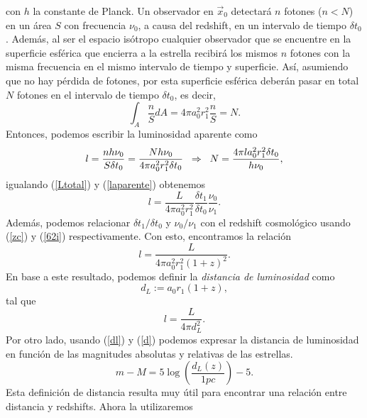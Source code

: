 con $h$ la constante de Planck. Un observador en $\vec{x}_{0}$ detectará $n$ fotones ($n<N$) en un área $S$ con frecuencia $\nu_{0}$, a causa del redshift,
en un intervalo de tiempo $\delta t_{0}$. Además, al ser el espacio isótropo cualquier observador que se encuentre en la superficie
esférica que encierra a la estrella recibirá los mismos $n$ fotones con la misma frecuencia en el mismo intervalo de tiempo y superficie. Así,
asumiendo que no hay pérdida de fotones, por esta superficie esférica deberán pasar en total $N$ fotones en el intervalo
de tiempo $\delta t_{0}$, es decir,
\begin{equation}
\int_{A}\frac{n}{S}dA=4\pi a_{0}^2 r_{1}^2 \frac{n}{S}= N.
\end{equation}
Entonces, podemos escribir la luminosidad aparente como
\begin{equation}
 l=\frac{nh\nu_{0}}{S\delta t_{0}} =\frac{Nh\nu_{0}}{4\pi a_{0}^2r_{1}^2\delta t_{0}}  \hspace{0.2cm} \Rightarrow \hspace{0.2cm} N=\frac{4\pi l a_{0}^2r_{1}^2\delta t_{0}}{h\nu_{0}},\label{laparente} 
\end{equation}
igualando (\ref{Ltotal}) y (\ref{laparente}) obtenemos
\begin{equation}
l=\frac{L}{4\pi a_{0}^2 r_{1}^2}\frac{\delta t_{1}}{\delta t_{0}}\frac{\nu_{0}}{\nu_{1}}.
\end{equation}
Además, podemos relacionar $\delta t_{1}/\delta t_{0}$ y $\nu_{0}/\nu_{1}$ con el redshift cosmológico usando (\ref{zc}) y (\ref{62i})
respectivamente. Con esto, encontramos la relación
\begin{equation}
l =\frac{L}{4\pi a_{0}^2 r_{1}^2 (1+z)^2}.
\end{equation}
En base a este resultado, podemos definir la \textit{distancia de luminosidad} como
\begin{equation}
d_{L} :=  a_{0} r_{1} (1+z), \label{dl}
\end{equation}
tal que 
\begin{equation}
l=\frac{L}{4\pi d_{L}^2}.
\end{equation}
Por otro lado, usando (\ref{dl}) y (\ref{d}) podemos expresar la distancia de luminosidad en función de las magnitudes absolutas y relativas de las estrellas.
\begin{equation}
m-M = 5\log\left(\frac{d_L(z)}{1pc}\right) - 5. \label{m-M}
\end{equation}
Esta definición de distancia resulta muy útil para encontrar una relación entre distancia y redshifts. Ahora la utilizaremos
